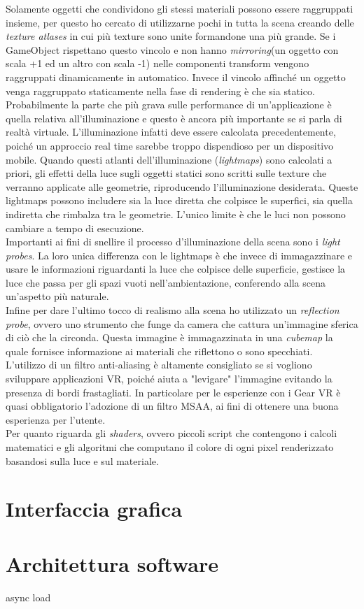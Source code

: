 Solamente oggetti che condividono gli stessi materiali possono essere raggruppati insieme, per questo ho cercato di utilizzarne pochi in tutta la scena creando delle \textit{texture atlases} in cui più texture sono unite formandone una più grande. Se i GameObject rispettano questo vincolo e non hanno \textit{mirroring}(un oggetto con scala +1 ed un altro con scala -1) nelle componenti transform vengono raggruppati dinamicamente in automatico. Invece il vincolo affinché un oggetto venga raggruppato staticamente nella fase di rendering è che sia statico. \\

Probabilmente la parte che più grava sulle performance di un'applicazione è quella relativa all'illuminazione e questo è ancora più importante se si parla di realtà virtuale. L'illuminazione infatti deve essere calcolata precedentemente, poiché un approccio real time sarebbe troppo dispendioso per un dispositivo mobile. Quando questi atlanti dell'illuminazione (\textit{lightmaps}) sono calcolati a priori, gli effetti della luce sugli oggetti statici sono scritti sulle texture che verranno applicate alle geometrie, riproducendo l'illuminazione desiderata. Queste lightmaps possono includere sia la luce diretta che colpisce le superfici, sia quella indiretta che rimbalza tra le geometrie. L'unico limite è che le luci non possono cambiare a tempo di esecuzione. \\
Importanti ai fini di snellire il processo d'illuminazione della scena sono i \textit{light probes}. La loro unica differenza con le lightmaps è che invece di immagazzinare e usare le informazioni riguardanti la luce che colpisce delle superficie, gestisce la luce che passa per gli spazi vuoti nell'ambientazione, conferendo alla scena un'aspetto più naturale. \\
Infine per dare l'ultimo tocco di realismo alla scena ho utilizzato un \textit{reflection probe}, ovvero uno strumento che funge da camera che cattura un'immagine sferica di ciò che la circonda. Questa immagine è immagazzinata in una \textit{cubemap} la quale fornisce informazione ai materiali che riflettono o sono specchiati.\\

L'utilizzo di un filtro anti-aliasing è altamente consigliato se si vogliono sviluppare applicazioni VR, poiché aiuta a "levigare" l'immagine evitando la presenza di bordi frastagliati. In particolare per le esperienze con i Gear VR è quasi obbligatorio l'adozione di un filtro MSAA, ai fini di ottenere una buona esperienza per l'utente. \\

Per quanto riguarda gli \textit{shaders}, ovvero piccoli script che contengono i calcoli matematici e gli algoritmi che computano il colore di ogni pixel renderizzato basandosi sulla luce e sul materiale.




\section{Interfaccia grafica}
\section{Architettura software}
async load
